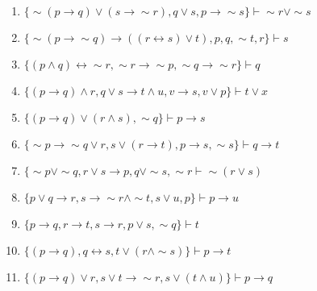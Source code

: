 \documentclass[12pt, a4paper,final]{article}
\begin{document}
\begin{enumerate}
\begin{enumerate}
            \item $\{ \sim (p \rightarrow q) \vee ( s  \rightarrow  \sim r), q\vee s, p \rightarrow \sim s  \} \vdash  \sim r \vee \sim s $ %
            
            \item $\{\sim (p \rightarrow \sim q) \rightarrow ((r \leftrightarrow s) \vee t), p, q, \sim t, r \} \vdash s $ %
            
            \item $\{(p \wedge q) \leftrightarrow \sim r,     \sim r \rightarrow \sim p,    \sim q \rightarrow \sim r   \} \vdash   q $  %
            
            \item $\{(p \rightarrow q) \wedge r,   q \vee s \rightarrow t \wedge u,   v \rightarrow s,   v \vee p \} \vdash  t \vee x $  %
            
            \item $\{ (p \rightarrow q) \vee (r \wedge s), \sim q \} \vdash p \rightarrow s$ %
            
            \item $\{\sim p \rightarrow \sim q \vee r, s \vee (r \rightarrow t), p \rightarrow s, \sim s \} \vdash q \rightarrow t$  %
            
            \item $\{ \sim p \vee \sim q, r \vee s \rightarrow p, q \vee\sim s, \sim r \vdash \sim(r \vee s)$  %
            
            \item $\{ p \vee q \rightarrow r, s \rightarrow \sim r \wedge \sim t, s \vee u,   p   \} \vdash p \rightarrow u$  %
            
            \item $\{ p \rightarrow q, r \rightarrow t, s \rightarrow r, p \vee s, \sim q  \} \vdash  t $ %
            
            \item $\{ ( p \rightarrow q),  q \leftrightarrow s, t\vee (r \wedge \sim s) \} \vdash  p \rightarrow t $ %

            \item $\{(p \rightarrow q) \vee r,    s \vee t \rightarrow \sim r,    s \vee (t \wedge u)  \} \vdash p \rightarrow q $ %


\end{enumerate}
\end{enumerate}
\end{document}
